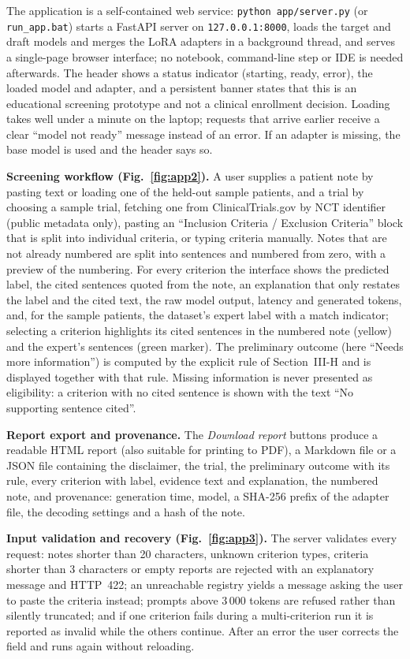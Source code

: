 The application is a self-contained web service: \texttt{python app/server.py} (or \texttt{run\_app.bat}) starts a FastAPI server on \texttt{127.0.0.1:8000}, loads the target and draft models and merges the LoRA adapters in a background thread, and serves a single-page browser interface; no notebook, command-line step or IDE is needed afterwards. The header shows a status indicator (starting, ready, error), the loaded model and adapter, and a persistent banner states that this is an educational screening prototype and not a clinical enrollment decision. Loading takes well under a minute on the laptop; requests that arrive earlier receive a clear ``model not ready'' message instead of an error. If an adapter is missing, the base model is used and the header says so.

\textbf{Screening workflow (Fig.~\ref{fig:app2}).} A user supplies a patient note by pasting text or loading one of the held-out sample patients, and a trial by choosing a sample trial, fetching one from ClinicalTrials.gov by NCT identifier (public metadata only), pasting an ``Inclusion Criteria / Exclusion Criteria'' block that is split into individual criteria, or typing criteria manually. Notes that are not already numbered are split into sentences and numbered from zero, with a preview of the numbering. For every criterion the interface shows the predicted label, the cited sentences quoted from the note, an explanation that only restates the label and the cited text, the raw model output, latency and generated tokens, and, for the sample patients, the dataset's expert label with a match indicator; selecting a criterion highlights its cited sentences in the numbered note (yellow) and the expert's sentences (green marker). The preliminary outcome (here ``Needs more information'') is computed by the explicit rule of Section~III-H and is displayed together with that rule. Missing information is never presented as eligibility: a criterion with no cited sentence is shown with the text ``No supporting sentence cited''.

\textbf{Report export and provenance.} The \emph{Download report} buttons produce a readable HTML report (also suitable for printing to PDF), a Markdown file or a JSON file containing the disclaimer, the trial, the preliminary outcome with its rule, every criterion with label, evidence text and explanation, the numbered note, and provenance: generation time, model, a SHA-256 prefix of the adapter file, the decoding settings and a hash of the note.

\textbf{Input validation and recovery (Fig.~\ref{fig:app3}).} The server validates every request: notes shorter than 20 characters, unknown criterion types, criteria shorter than 3 characters or empty reports are rejected with an explanatory message and HTTP~422; an unreachable registry yields a message asking the user to paste the criteria instead; prompts above 3\,000 tokens are refused rather than silently truncated; and if one criterion fails during a multi-criterion run it is reported as invalid while the others continue. After an error the user corrects the field and runs again without reloading.

